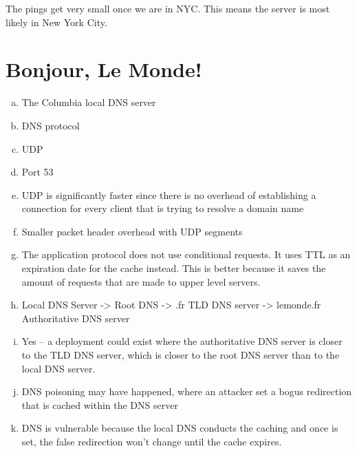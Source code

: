 \documentclass[11pt]{article}
\begin{document}
\begin{enumerate}[(a)]
      The pings get very small once we are in NYC. This means the server is most
      likely in New York City.
  \end{enumerate}

\section*{Bonjour, Le Monde!}
  \begin{enumerate}[(a)]
    \item The Columbia local DNS server
    \item DNS protocol
    \item UDP
    \item Port 53
    \item UDP is significantly faster since there is no overhead of establishing
          a connection for every client that is trying to resolve a domain name
    \item Smaller packet header overhead with UDP segments
    \item The application protocol does not use conditional requests. It uses TTL
          as an expiration date for the cache instead. This is better because it
          saves the amount of requests that are made to upper level servers.
    \item Local DNS Server -> Root DNS -> .fr TLD DNS server -> lemonde.fr Authoritative DNS server
    \item Yes -- a deployment could exist where the authoritative DNS server is closer
          to the TLD DNS server, which is closer to the root DNS server than
          to the local DNS server.
    \item DNS poisoning may have happened, where an attacker set a bogus redirection
          that is cached within the DNS server
    \item DNS is vulnerable because the local DNS conducts the caching and once
          is set, the false redirection won't change until the cache expires.
  \end{enumerate}
\end{document}
